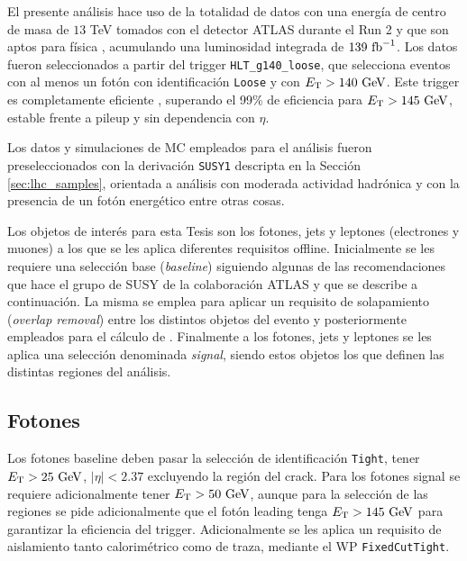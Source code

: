 El presente análisis hace uso de la totalidad de datos con una energía de centro de masa de $13$ TeV tomados con el detector ATLAS durante el Run 2 y que son aptos para física , acumulando una luminosidad integrada de $139\ \text{fb}^{-1}$. Los datos fueron seleccionados a partir del trigger \texttt{HLT\_g140\_loose}, que selecciona eventos con al menos un fotón con identificación \texttt{Loose} y con $E_{\text{T}}>140\ \text{GeV}$. Este trigger es completamente eficiente \cite{TRIG-2018-05}, superando el 99\% de eficiencia para $E_{\text{T}}>145\ \text{GeV}$, estable frente a pileup y sin dependencia con $\eta$.

Los datos y simulaciones de MC empleados para el análisis fueron preseleccionados con la derivación \texttt{SUSY1} descripta en la Sección \ref{sec:lhc_samples}, orientada a análisis con moderada actividad hadrónica y con la presencia de un fotón energético entre otras cosas.

Los objetos de interés para esta Tesis son los fotones, jets y leptones (electrones y muones) a los que se les aplica diferentes requisitos offline. Inicialmente se les requiere una selección base (\textit{baseline}) siguiendo algunas de las recomendaciones que hace el grupo de SUSY de la colaboración ATLAS y que se describe a continuación. La misma se emplea para aplicar un requisito de solapamiento (\textit{overlap removal}) entre los distintos objetos del evento y posteriormente empleados para el cálculo de \met. Finalmente a los fotones, jets y leptones se les aplica una selección denominada \textit{signal}, siendo estos objetos los que definen las distintas regiones del análisis. 


\subsection{Fotones}

Los fotones baseline deben pasar la selección de identificación \texttt{Tight}, tener $\ET>25\ \gev$, $|\eta|<2.37$ excluyendo la región del crack. Para los fotones signal se requiere adicionalmente tener $E_{\text{T}}>50\ \text{GeV}$, aunque para la selección de las regiones se pide adicionalmente que el fotón leading tenga $E_{\text{T}}>145\ \text{GeV}$ para garantizar la eficiencia del trigger. Adicionalmente se les aplica un requisito de aislamiento tanto calorimétrico como de traza, mediante el WP \texttt{FixedCutTight}.


